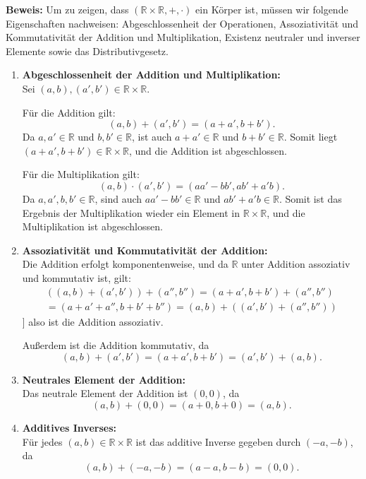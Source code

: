 \documentclass[11pt]{article}
\begin{document}
\textbf{Beweis:} Um zu zeigen, dass \( (\mathbb{R} \times \mathbb{R}, +, \cdot) \) ein Körper ist, müssen wir folgende Eigenschaften nachweisen: Abgeschlossenheit der Operationen, Assoziativität und Kommutativität der Addition und Multiplikation, Existenz neutraler und inverser Elemente sowie das Distributivgesetz.

\begin{enumerate}
   \item \textbf{Abgeschlossenheit der Addition und Multiplikation:} \\
   Sei \( (a, b), (a', b') \in \mathbb{R} \times \mathbb{R} \).

   Für die Addition gilt:
   \[
   (a, b) + (a', b') = (a + a', b + b').
   \]
   Da \( a, a' \in \mathbb{R} \) und \( b, b' \in \mathbb{R} \), ist auch \( a + a' \in \mathbb{R} \) und \( b + b' \in \mathbb{R} \). Somit liegt \( (a + a', b + b') \in \mathbb{R} \times \mathbb{R} \), und die Addition ist abgeschlossen.

   Für die Multiplikation gilt:
   \[
   (a, b) \cdot (a', b') = (aa' - bb', ab' + a'b).
   \]
   Da \( a, a', b, b' \in \mathbb{R} \), sind auch \( aa' - bb' \in \mathbb{R} \) und \( ab' + a'b \in \mathbb{R} \). Somit ist das Ergebnis der Multiplikation wieder ein Element in \( \mathbb{R} \times \mathbb{R} \), und die Multiplikation ist abgeschlossen.

   \item \textbf{Assoziativität und Kommutativität der Addition:} \\
   Die Addition erfolgt komponentenweise, und da \( \mathbb{R} \) unter Addition assoziativ und kommutativ ist, gilt:
   \begin{align}
   ((a, b) + (a', b')) + (a'', b'') = (a + a', b + b') + (a'', b'') \\
   = (a + a' + a'', b + b' + b'') = (a, b) + ((a', b') + (a'', b''))
   \end{align}]
   also ist die Addition assoziativ.

   Außerdem ist die Addition kommutativ, da
   \[
   (a, b) + (a', b') = (a + a', b + b') = (a', b') + (a, b).
   \]

   \item \textbf{Neutrales Element der Addition:} \\
   Das neutrale Element der Addition ist \( (0, 0) \), da
   \[
   (a, b) + (0, 0) = (a + 0, b + 0) = (a, b).
   \]

   \item \textbf{Additives Inverses:} \\
   Für jedes \( (a, b) \in \mathbb{R} \times \mathbb{R} \) ist das additive Inverse gegeben durch \( (-a, -b) \), da
   \[
   (a, b) + (-a, -b) = (a - a, b - b) = (0, 0).
   \]


\end{enumerate}
\end{document}
